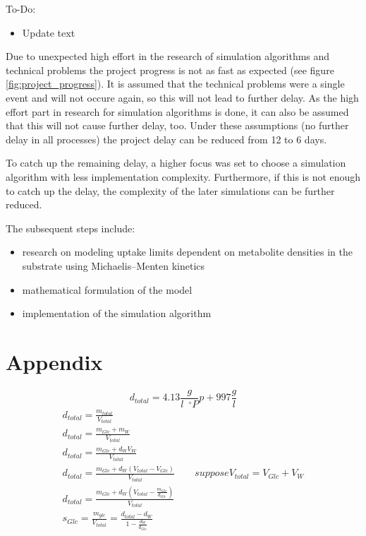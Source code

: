 \documentclass[a4paper,10pt]{article}
\begin{document}
To-Do:
\begin{itemize}
 \item Update text
\end{itemize}


Due to unexpected high effort in the research of simulation algorithms and technical problems the project progress is not as fast
as expected (see figure \ref{fig:project_progress}). It is assumed that the technical problems were a single event and will not
occure again, so this will not lead to further delay. As the high effort part in research for simulation algorithms is done, it
can also be assumed that this will not cause further delay, too. Under these assumptions (no further delay in all processes) the
project delay can be reduced from 12 to 6 days.

To catch up the remaining delay, a higher focus was set to choose a simulation algorithm with less implementation complexity.
Furthermore, if this is not enough to catch up the delay, the complexity of the later simulations can be further reduced.

\vspace{0.5cm}
The subsequent steps include:
\begin{itemize}
 \item research on modeling uptake limits dependent on metabolite densities in the substrate using Michaelis–Menten kinetics
 \item mathematical formulation of the model
 \item implementation of the simulation algorithm
\end{itemize}




\newpage

\printbibliography

\section{Appendix}

\begin{equation}
 d_{total} = 4.13 \frac{g}{l \,\,\, ^\circ P} p + 997 \frac{g}{l}
\end{equation}
\begin{align}
 d_{total} = \frac{m_{total}}{V_{total}}\\
 d_{total} = \frac{m_{Glc} + m_W}{V_{total}}\\
 d_{total} = \frac{m_{Glc} + d_W V_W}{V_{total}}\\
 d_{total} = \frac{m_{Glc} + d_W \left(V_{total} - V_{Glc}\right)}{V_{total}} \qquad suppose V_{total} = V_{Glc} + V_W\\
 d_{total} = \frac{m_{Glc} + d_W \left(V_{total} - \frac{m_{Glc}}{d_{Glc}}\right)}{V_{total}}\\
 s_{Glc} = \frac{m_{glc}}{V_{total}} = \frac{d_{total} - d_W}{1 - \frac{d_W}{d_{Glc}}}
\end{align}
\end{document}
